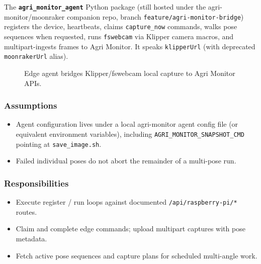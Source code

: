 The \textbf{\texttt{agri\_monitor\_agent}} Python package (still hosted under the agri-monitor/moonraker companion repo, branch \texttt{feature/agri-monitor-bridge}) registers the device, heartbeats, claims \texttt{capture\_now} commands, walks pose sequences when requested, runs \texttt{fswebcam} via Klipper camera macros, and multipart-ingests frames to Agri Monitor. It speaks \texttt{klipperUrl} (with deprecated \texttt{moonrakerUrl} alias).

\begin{figure}[H]
\centering
{}
\caption{Edge agent bridges Klipper/fswebcam local capture to Agri Monitor APIs.}
\label{fig:hw-agent}
\end{figure}

\subsubsection{Assumptions}
\begin{itemize}
  \item Agent configuration lives under a local agri-monitor agent config file (or equivalent environment variables), including \texttt{AGRI_MONITOR\_SNAPSHOT\_CMD} pointing at \texttt{save\_image.sh}.
  \item Failed individual poses do not abort the remainder of a multi-pose run.
\end{itemize}

\subsubsection{Responsibilities}
\begin{itemize}
  \item Execute register / run loops against documented \texttt{/api/raspberry-pi/*} routes.
  \item Claim and complete edge commands; upload multipart captures with pose metadata.
  \item Fetch active pose sequences and capture plans for scheduled multi-angle work.
\end{itemize}

